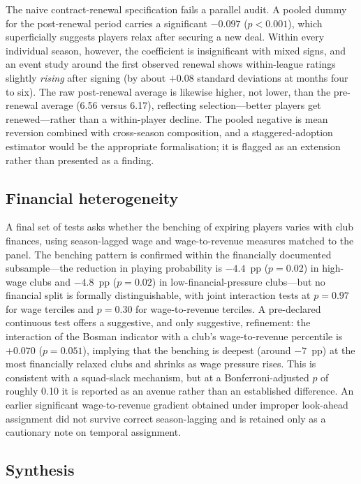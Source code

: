 The naive contract-renewal specification fails a parallel audit. A pooled dummy
for the post-renewal period carries a significant $-0.097$ ($p < 0.001$), which
superficially suggests players relax after securing a new deal. Within every
individual season, however, the coefficient is insignificant with mixed signs,
and an event study around the first observed renewal shows within-league ratings
slightly \emph{rising} after signing (by about $+0.08$ standard deviations at
months four to six). The raw post-renewal average is likewise higher, not lower,
than the pre-renewal average (6.56 versus 6.17), reflecting selection---better
players get renewed---rather than a within-player decline. The pooled negative is
mean reversion combined with cross-season composition, and a staggered-adoption
estimator would be the appropriate formalisation; it is flagged as an extension
rather than presented as a finding.

\subsection{Financial heterogeneity}
\label{sec:results-financial}

A final set of tests asks whether the benching of expiring players varies with
club finances, using season-lagged wage and wage-to-revenue measures matched to
the panel. The benching pattern is confirmed within the financially documented
subsample---the reduction in playing probability is $-4.4$~pp ($p = 0.02$) in
high-wage clubs and $-4.8$~pp ($p = 0.02$) in low-financial-pressure
clubs---but no financial split is formally distinguishable, with joint
interaction tests at $p = 0.97$ for wage terciles and $p = 0.30$ for
wage-to-revenue terciles. A pre-declared continuous test offers a suggestive,
and only suggestive, refinement: the interaction of the Bosman indicator with a
club's wage-to-revenue percentile is $+0.070$ ($p = 0.051$), implying that the
benching is deepest (around $-7$~pp) at the most financially relaxed clubs and
shrinks as wage pressure rises. This is consistent with a squad-slack mechanism,
but at a Bonferroni-adjusted $p$ of roughly 0.10 it is reported as an avenue
rather than an established difference. An earlier significant wage-to-revenue
gradient obtained under improper look-ahead assignment did not survive correct
season-lagging and is retained only as a cautionary note on temporal assignment.

\subsection{Synthesis}
\label{sec:results-synthesis}

